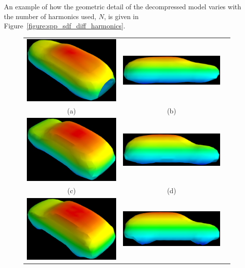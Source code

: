 An example of how the geometric detail of the decompressed model varies with the number 
of harmonics used, \( N \), is given in Figure~\ref{figure:spp_sdf_diff_harmonics}.
\begin{figure}[!htbp]
  \centering
  \begin{tabular}{ccc}
    \includegraphics[width=.4\linewidth]{figures/spp/differing_harmonics/1.eps}&
		\includegraphics[width=.4\linewidth]{figures/spp/differing_harmonics/1_side.eps}\\
    (a) & (b) \\
    \includegraphics[width=.4\linewidth]{figures/spp/differing_harmonics/3.eps}&
		\includegraphics[width=.4\linewidth]{figures/spp/differing_harmonics/3_side.eps}\\
    (c) & (d) \\
    \includegraphics[width=.4\linewidth]{figures/spp/differing_harmonics/all.eps}&
		\includegraphics[width=.4\linewidth]{figures/spp/differing_harmonics/all_side.eps}\\

\end{tabular}
\end{figure}
